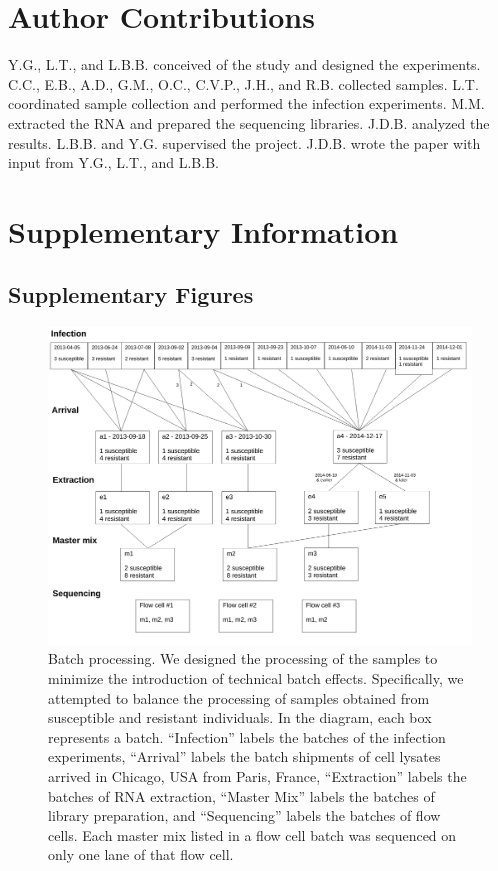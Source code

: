 \documentclass[fleqn,10pt]{wlscirep}
\newcommand{\beginsupplement}{%
 \setcounter{table}{0}
 \renewcommand{\thetable}{S\arabic{table}}%
 \setcounter{figure}{0}
 \renewcommand{\thefigure}{S\arabic{figure}}%
 }
\begin{document}
\section*{Author Contributions}

Y.G., L.T., and L.B.B. conceived of the study and designed the
experiments. C.C., E.B., A.D., G.M., O.C., C.V.P., J.H., and R.B.
collected samples. L.T. coordinated sample collection and performed
the infection experiments. M.M. extracted the RNA and prepared the
sequencing libraries. J.D.B. analyzed the results. L.B.B. and Y.G.
supervised the project. J.D.B. wrote the paper with input from Y.G.,
L.T., and L.B.B.



\clearpage\newpage
\beginsupplement
\section*{Supplementary Information}

\subsection*{Supplementary Figures}


\begin{figure}[ht]
\centering
\includegraphics[width=\linewidth]{../figure/processing.pdf}
\caption{
Batch processing. We designed the processing of the samples to
minimize the introduction of technical batch effects. Specifically, we
attempted to balance the processing of samples obtained from
susceptible and resistant individuals. In the diagram, each box
represents a batch. “Infection” labels the batches of the infection
experiments, “Arrival” labels the batch shipments of cell lysates
arrived in Chicago, USA from Paris, France, “Extraction” labels the
batches of RNA extraction, “Master Mix” labels the batches of library
preparation, and “Sequencing” labels the batches of flow cells. Each
master mix listed in a flow cell batch was sequenced on only one lane
of that flow cell.
}
\label{fig:process}
\end{figure}
\end{document}
